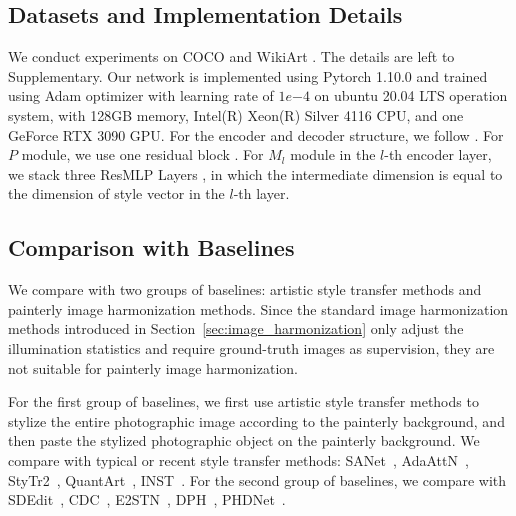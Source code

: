 \documentclass[letterpaper]{article} %
\begin{document}
\subsection{Datasets and Implementation Details} \label{sec:imp_detail}

We conduct experiments on COCO \cite{lin2014microsoft} and WikiArt \cite{nichol2016painter}. The details are left to Supplementary.
Our network is implemented using Pytorch 1.10.0 and trained using Adam optimizer with learning rate of $1e{-4}$ on ubuntu 20.04 LTS operation system, with 128GB memory, Intel(R) Xeon(R) Silver 4116 CPU, and one GeForce RTX 3090 GPU. For the encoder and decoder structure, we follow \cite{cao2022painterly}. For $P$ module, we use one residual block \cite{he2016deep}. For $M_l$ module in the $l$-th encoder layer, we stack three ResMLP Layers \cite{TouvronBCCEGIJSVJ23}, in which the intermediate dimension is equal to the dimension of style vector in the $l$-th layer.


\subsection{Comparison with Baselines} \label{sec:cmp_with_baseline}

We compare with two groups of baselines: artistic style transfer methods and painterly image harmonization methods.  Since the standard image harmonization methods introduced in Section~\ref{sec:image_harmonization} only adjust the illumination statistics and require ground-truth images as supervision, they are not suitable for painterly image harmonization.

For the first group of baselines, we first use artistic style transfer methods to stylize the entire photographic image according to the painterly background, and then paste the stylized photographic object on the painterly background.
We compare with typical or recent style transfer methods: SANet~\cite{park2019arbitrary}, AdaAttN~\cite{liu2021adaattn},  StyTr2~\cite{deng2022stytr2}, QuantArt~\cite{quantart}, INST~\cite{inst}.
For the second group of baselines, we compare with SDEdit~\cite{sdedit}, CDC~\cite{cdc}, E2STN~\cite{peng2019element}, DPH~\cite{luan2018deep}, PHDNet~\cite{cao2022painterly}.
\end{document}
